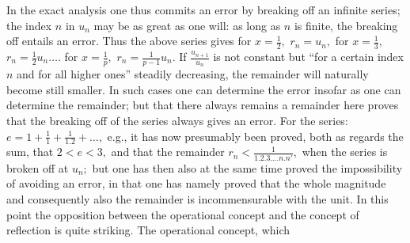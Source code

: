 \documentclass[12pt,a4paper,openany]{book}
\begin{document}
In the exact analysis one thus commits an error by breaking off an infinite series; the index $n$ in $u_{n}$ may be as great as one will: as long as $n$ is finite, the breaking off entails an error. Thus the above series gives for $x=\frac{1}{2},$ $r_{n}=u_{n},$ for $x=\frac{1}{3},$ $r_{n}=\frac{1}{2}u_{n}\ldots.$ for $x=\frac{1}{p},$ $r_{n}=\frac{1}{p-1}u_{n}.$ If $\frac{u_{n+1}}{u_{n}}$ is not constant but ``for a certain index $n$ and for all higher ones'' steadily decreasing, the remainder will naturally become still smaller. In such cases one can determine the error insofar as one can determine the remainder; but that there always remains a remainder here proves that the breaking off of the series always gives an error. For the series: $e=1+\frac{1}{1}+\frac{1}{1.2}+\ldots,$ e.g., it has now presumably been proved, both as regards the sum, that $2<e<3,$ and that the remainder $r_{n}<\frac{1}{1.2.3\ldots.n.n'},$ when the series is broken off at $u_{n};$ but one has then also at the same time proved the impossibility of avoiding an error, in that one has namely proved that the whole magnitude and consequently also the remainder is incommensurable with the unit. In this point the opposition between the operational concept and the concept of reflection is quite striking. The operational concept, which
\setcounter{footnote}{0}%
\end{document}
